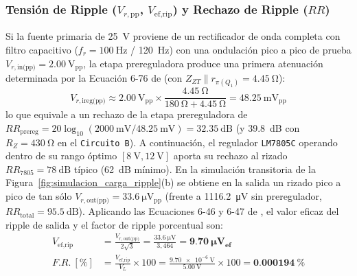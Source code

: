 \subsubsection{Tensión de Ripple ($V_{r,\text{pp}}$, $V_{\text{ef,rip}}$) y Rechazo de Ripple ($RR$)}
Si la fuente primaria de \SI{25}{\volt} proviene de un rectificador de onda completa con filtro capacitivo ($f_r = \SI{100}{\hertz}$ / \SI{120}{\hertz}) con una ondulación pico a pico de prueba $V_{r,\text{in(pp)}} = \SI{2,00}{\volt_{\text{pp}}}$, la etapa prereguladora produce una primera atenuación determinada por la Ecuación 6-76 de \cite{gonzalez_p2} (con $Z_{ZT} \parallel r_{\pi(Q_1)} = \SI{4,45}{\ohm}$):
\begin{equation}
    V_{r,\text{ireg(pp)}} \approx \SI{2,00}{\volt_{\text{pp}}} \times \frac{\SI{4,45}{\ohm}}{\SI{180}{\ohm} + \SI{4,45}{\ohm}} = \SI{48,25}{\milli\volt_{\text{pp}}}
    \label{eq:ripple_prereg}
\end{equation}
lo que equivale a un rechazo de la etapa prereguladora de $RR_{\text{prereg}} = 20\log_{10}(\SI{2000}{\milli\volt} / \SI{48,25}{\milli\volt}) = \SI{32,35}{\deci\bel}$ (y \SI{39,8}{\deci\bel} con $R_Z = \SI{430}{\ohm}$ en el \texttt{Circuito B}). A continuación, el regulador \texttt{LM7805C} operando dentro de su rango óptimo $[\SI{8}{\volt}, \SI{12}{\volt}]$ aporta su rechazo al rizado $RR_{\text{7805}} = \SI{78}{\deci\bel}$ típico (\SI{62}{\deci\bel} mínimo). En la simulación transitoria de la Figura~\ref{fig:simulacion_carga_ripple}(b) se obtiene en la salida un rizado pico a pico de tan sólo \textbf{$V_{r,\text{out(pp)}} = \SI{33,6}{\micro\volt_{\text{pp}}}$} (frente a \SI{1116,2}{\micro\volt_{}} sin preregulador, $RR_{\text{total}} = \SI{95,5}{\deci\bel}$). Aplicando las Ecuaciones 6-46 y 6-47 de \cite{gonzalez_p2}, el valor eficaz del ripple de salida y el factor de ripple porcentual son:
\begin{align}
    V_{\text{ef,rip}} &= \frac{V_{r,\text{out(pp)}}}{2\sqrt{3}} = \frac{\SI{33,6}{\micro\volt}}{3,464} = \mathbf{\SI{9,70}{\micro\volt_{\text{ef}}}} \label{eq:vef_rip}\\
    F.R.\ [\%] &= \frac{V_{\text{ef,rip}}}{V_L} \times 100 = \frac{\SI{9,70e-6}{\volt}}{\SI{5,00}{\volt}} \times 100 = \mathbf{\SI{0,000194}{\percent}} \label{eq:fr_pct}
\end{align}

